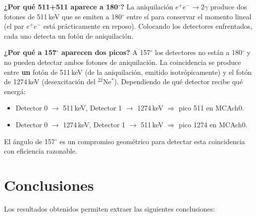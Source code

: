 \documentclass[12pt,a4paper]{article}
\begin{document}
\textbf{¿Por qu\'e 511+511 aparece a 180$^\circ$?}
La aniquilaci\'on $e^+e^- \to 2\gamma$ produce dos fotones de 511\,keV que se emiten a
180$^\circ$ entre s\'i para conservar el momento lineal (el par $e^+e^-$ est\'a pr\'acticamente
en reposo). Colocando los detectores enfrentados, cada uno detecta un fot\'on de aniquilaci\'on.

\textbf{¿Por qu\'e a 157$^\circ$ aparecen dos picos?}
A 157$^\circ$ los detectores no est\'an a 180$^\circ$ y no pueden detectar ambos fotones de
aniquilaci\'on. La coincidencia se produce entre \textbf{un} fot\'on de 511\,keV
(de la aniquilaci\'on, emitido isotr\'opicamente) y el fot\'on de 1274\,keV
(desexcitaci\'on del $^{22}$Ne$^*$). Dependiendo de qu\'e detector recibe qu\'e energ\'a:
\begin{itemize}
  \item Detector 0 $\to$ 511\,keV, Detector 1 $\to$ 1274\,keV $\Rightarrow$ pico 511 en MCAch0.
  \item Detector 0 $\to$ 1274\,keV, Detector 1 $\to$ 511\,keV $\Rightarrow$ pico 1274 en MCAch0.
\end{itemize}
El \'angulo de 157$^\circ$ es un compromiso geom\'etrico para detectar esta coincidencia
con eficiencia razonable.

\section{Conclusiones}

Los resultados obtenidos permiten extraer las siguientes conclusiones:
\end{document}
